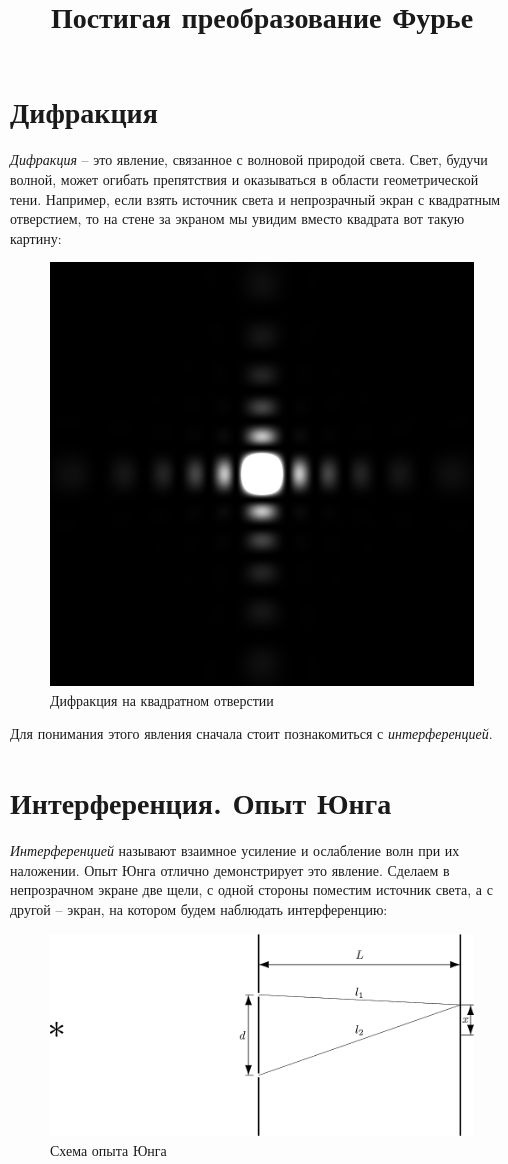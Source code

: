 \documentclass{ncc}
\title{Постигая преобразование Фурье}
\begin{document}
\maketitle
\tableofcontents

\section{Дифракция}

\textit{Дифракция} -- это явление, связанное с волновой природой света. Свет, будучи
волной, может огибать препятствия и оказываться в области геометрической тени.
Например, если взять источник света и непрозрачный экран с квадратным
отверстием, то на стене за экраном мы увидим вместо квадрата вот такую картину:
\begin{figure}[h!]
\center
\includegraphics[width=.35\textwidth]{2015-10-12-difraction-square.png}
\caption{Дифракция на квадратном отверстии}
\end{figure}

Для понимания этого явления сначала стоит познакомиться с \textit{интерференцией}.

\section{Интерференция. Опыт Юнга}
\textit{Интерференцией} называют взаимное усиление и ослабление волн при их наложении. Опыт Юнга отлично демонстрирует это
явление.
Сделаем в непрозрачном экране две щели, с одной стороны поместим источник света, а с другой -- экран, на котором будем наблюдать интерференцию:
\begin{figure}[h]
\center
\includegraphics[width=\textwidth]{2015-10-12-difraction-exp.png}
\caption{Схема опыта Юнга}
\end{figure}
\end{document}
